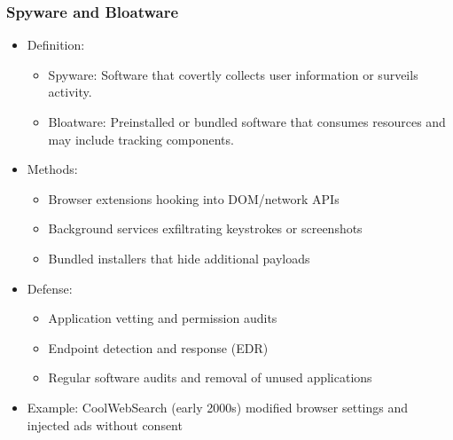\documentclass[11pt]{article}
\begin{document}
\subsubsection{Spyware and Bloatware}
\label{sec:org363c4af}
\begin{itemize}
\item Definition:
\begin{itemize}
\item Spyware: Software that covertly collects user information or surveils activity.
\item Bloatware: Preinstalled or bundled software that consumes resources and may include tracking components.
\end{itemize}
\item Methods:
\begin{itemize}
\item Browser extensions hooking into DOM/network APIs
\item Background services exfiltrating keystrokes or screenshots
\item Bundled installers that hide additional payloads
\end{itemize}
\item Defense:
\begin{itemize}
\item Application vetting and permission audits
\item Endpoint detection and response (EDR)
\item Regular software audits and removal of unused applications
\end{itemize}
\item Example: CoolWebSearch (early 2000s) modified browser settings and injected ads without consent
\end{itemize}
\end{document}
